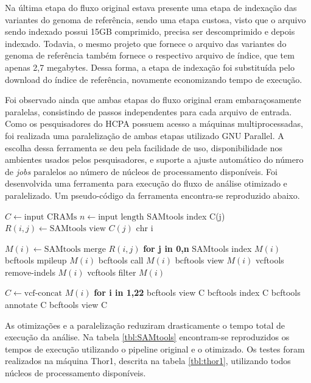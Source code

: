 \documentclass[cic,tc]{iiufrgs}
\begin{document}
Na última etapa do fluxo original estava presente uma etapa de indexação das
variantes do genoma de referência, sendo uma etapa custosa, visto que o arquivo
sendo indexado possui 15GB comprimido, precisa ser descomprimido e depois
indexado. Todavia, o mesmo projeto que fornece o arquivo das variantes do
genoma de referência também fornece o respectivo arquivo de índice, que tem
apenas 2,7 megabytes. Dessa forma, a etapa de indexação foi substituída pelo
download do índice de referência, novamente economizando tempo de execução.

Foi observado ainda que ambas etapas do fluxo original eram embaraçosamente
paralelas, consistindo de passos independentes para cada arquivo de entrada.
Como os pesquisadores do HCPA possuem acesso a máquinas multiprocessadas, foi
realizada uma paralelização de ambas etapas utilizado GNU
Parallel\cite{tange_ole_2021_5233953}. A escolha dessa ferramenta se deu pela facilidade
de uso, disponibilidade nos ambientes usados pelos pesquisadores, e suporte a
ajuste automático do número de \textit{jobs} paralelos ao número de núcleos de
processamento disponíveis. Foi desenvolvida uma ferramenta para execução do
fluxo de análise otimizado e paralelizado. Um pseudo-código da ferramenta
encontra-se reproduzido abaixo.

\begin{algorithmic}
  \State $C \gets \text{input CRAMs}$
  \State $n \gets \text{input length}$
  \State SAMtools index C(j)
    \State $R(i,j) \gets \text{SAMtools view } C(j) \text{ chr i}$
  \EndFor
\EndFor

  \State $M(i) \gets \text{SAMtools merge } R(i,j)$ \textbf{for j in 0,n}
  \State SAMtools index $M(i)$
  \State bcftools mpileup $M(i)$
  \State bcftools call $M(i)$
  \State bcftools view $M(i)$
  \State vcftools remove-indels $M(i)$
  \State vcftools filter $M(i)$
\EndFor

\State $C \gets \text{vcf-concat } M(i)$ \textbf{for i in 1,22}
\State bcftools view C
\State bcftools index C
\State bcftools annotate C
\State bcftools view C
\end{algorithmic}

As otimizações e a paralelização reduziram drasticamente o tempo total de
execução da análise. Na tabela \ref{tbl:SAMtools} encontram-se reproduzidos os
tempos de execução utilizando o pipeline original e o otimizado. Os testes
foram realizados na máquina Thor1, descrita na tabela \ref{tbl:thor1},
utilizando todos núcleos de processamento disponíveis.
\end{document}
